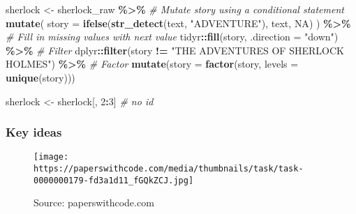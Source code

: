 \documentclass[
]{book}
\newenvironment{Shaded}{\begin{snugshade}}{\end{snugshade}}
\newcommand{\CommentTok}[1]{\textcolor[rgb]{0.56,0.35,0.01}{\textit{#1}}}
\newcommand{\DataTypeTok}[1]{\textcolor[rgb]{0.13,0.29,0.53}{#1}}
\newcommand{\DecValTok}[1]{\textcolor[rgb]{0.00,0.00,0.81}{#1}}
\newcommand{\KeywordTok}[1]{\textcolor[rgb]{0.13,0.29,0.53}{\textbf{#1}}}
\newcommand{\NormalTok}[1]{#1}
\newcommand{\OperatorTok}[1]{\textcolor[rgb]{0.81,0.36,0.00}{\textbf{#1}}}
\newcommand{\OtherTok}[1]{\textcolor[rgb]{0.56,0.35,0.01}{#1}}
\newcommand{\StringTok}[1]{\textcolor[rgb]{0.31,0.60,0.02}{#1}}
\begin{document}
\begin{Shaded}
\begin{Highlighting}[]
\NormalTok{sherlock \textless{}{-}}\StringTok{ }\NormalTok{sherlock\_raw }\OperatorTok{\%\textgreater{}\%}
\StringTok{  }\CommentTok{\# Mutate story using a conditional statement}
\StringTok{  }\KeywordTok{mutate}\NormalTok{(}
    \DataTypeTok{story =} \KeywordTok{ifelse}\NormalTok{(}\KeywordTok{str\_detect}\NormalTok{(text, }\StringTok{"ADVENTURE"}\NormalTok{), text, }\OtherTok{NA}\NormalTok{)}
\NormalTok{  ) }\OperatorTok{\%\textgreater{}\%}
\StringTok{  }\CommentTok{\# Fill in missing values with next value}
\StringTok{  }\NormalTok{tidyr}\OperatorTok{::}\KeywordTok{fill}\NormalTok{(story, }\DataTypeTok{.direction =} \StringTok{"down"}\NormalTok{) }\OperatorTok{\%\textgreater{}\%}
\StringTok{  }\CommentTok{\# Filter}
\StringTok{  }\NormalTok{dplyr}\OperatorTok{::}\KeywordTok{filter}\NormalTok{(story }\OperatorTok{!=}\StringTok{ "THE ADVENTURES OF SHERLOCK HOLMES"}\NormalTok{) }\OperatorTok{\%\textgreater{}\%}
\StringTok{  }\CommentTok{\# Factor}
\StringTok{  }\KeywordTok{mutate}\NormalTok{(}\DataTypeTok{story =} \KeywordTok{factor}\NormalTok{(story, }\DataTypeTok{levels =} \KeywordTok{unique}\NormalTok{(story)))}

\NormalTok{sherlock \textless{}{-}}\StringTok{ }\NormalTok{sherlock[, }\DecValTok{2}\OperatorTok{:}\DecValTok{3}\NormalTok{] }\CommentTok{\# no id}
\end{Highlighting}
\end{Shaded}

\hypertarget{key-ideas}{%
\subsubsection{Key ideas}\label{key-ideas}}

\begin{figure}
\centering
\texttt{[image: https://paperswithcode.com/media/thumbnails/task/task-0000000179-fd3a1d11\_fGQkZCJ.jpg]}
\caption{Source: paperswithcode.com}
\end{figure}
\end{document}
